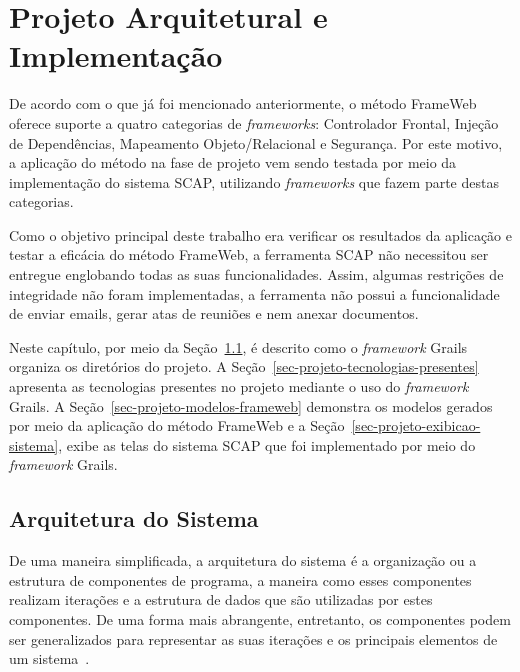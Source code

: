 \chapter{Projeto Arquitetural e Implementação}
\label{sec-projeto}

De acordo com o que já foi mencionado anteriormente, o método FrameWeb oferece suporte a quatro categorias de \textit{frameworks}: Controlador Frontal, Injeção de Dependências, Mapeamento Objeto/Relacional e Segurança. Por este motivo, a aplicação do método na fase de projeto vem sendo testada por meio da implementação do sistema SCAP, utilizando \textit{frameworks} que fazem parte destas categorias.

Como o objetivo principal deste trabalho era verificar os resultados da aplicação e testar a eficácia do método FrameWeb, a ferramenta SCAP não necessitou ser entregue englobando todas as suas funcionalidades. Assim, algumas restrições de integridade não foram implementadas, a ferramenta não possui a funcionalidade de enviar emails, gerar atas de reuniões e nem anexar documentos.

Neste capítulo, por meio da Seção~\ref{sec-projeto-arquitetura-sistema}, é descrito como o \textit{framework} Grails organiza os diretórios do projeto. A Seção~\ref{sec-projeto-tecnologias-presentes} apresenta as tecnologias presentes no projeto mediante o uso do \textit{framework} Grails. A Seção~\ref{sec-projeto-modelos-frameweb} demonstra os modelos gerados por meio da aplicação do método FrameWeb e a Seção~\ref{sec-projeto-exibicao-sistema}, exibe as telas do sistema SCAP que foi implementado por meio do \textit{framework} Grails.           

\section{Arquitetura do Sistema}
\label{sec-projeto-arquitetura-sistema}

De uma maneira simplificada, a arquitetura do sistema é a organização ou a estrutura de componentes de programa, a maneira como esses componentes realizam iterações e a estrutura de dados que são utilizadas por estes componentes. De uma forma mais abrangente, entretanto, os componentes podem ser generalizados para representar as suas iterações e os principais elementos de um sistema~\cite{pressman:es11}.


